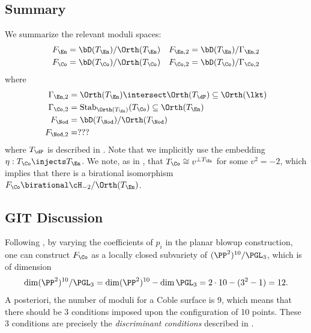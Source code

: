 \documentclass[../main.tex]{subfiles}
\begin{document}
\subsection{Summary}
We summarize the relevant moduli spaces:
\begin{align*}
F_\En &= \bD(T_\En)/\Orth(T_\En) & 
F_{\En, 2} &= \bD(T_\En)/\Gamma_{\En, 2} \\
F_\Co &= \bD(T_\Co) / \Orth(T_\Co) & 
F_{\Co, 2} &= \bD(T_\Co)/\Gamma_{\Co, 2} 
\end{align*}
where
\begin{align*}
\Gamma_{\En, 2} &= \Orth(T_\En) \intersect \Orth(T_\dP) \subseteq \Orth(\lkt) \\
\Gamma_{\Co, 2} &= \mathrm{Stab}_{\Orth(T_\En)}(T_\Co) \subseteq \Orth(T_\En) \\
F_{\Nod} &= \bD(T_\Nod)/\Orth(T_\Nod) \\
F_{\Nod, 2} &= ???
\end{align*}
where $T_{\dP}$ is described in \cite{AEGS23}.
Note that we implicitly use the embedding $\eta: T_\Co \injects T_\En$.
We note, as in \cite{DK13}, that $T_{\Co} \cong v^{\perp T_{\En}}$ for some $v^2=-2$, which implies that there is a birational isomorphism $F_{\Co} \birational \cH_{-2}/\Orth(T_\En)$.


\subsection{GIT Discussion}

\begin{remark}
Following \cite{DK13}, by varying the coefficients of $p_i$ in the planar blowup construction, one can construct $F_\Co$ as a locally closed subvariety of $(\PP^2)^{10}/\PGL_3$, which is of dimension
\[
\dim (\PP^2)^{10}/\PGL_3 = \dim (\PP^2)^{10} - \dim \PGL_3 = 2\cdot 10 - (3^2-1) = 12
.\]
A posteriori, the number of moduli for a Coble surface is 9, which means that there should be 3 conditions imposed upon the configuration of 10 points. These 3 conditions are precisely the \textit{discriminant conditions} described in \cite[\S 2, Prop. (10)]{Cob19}. 
\end{remark}
\end{document}
